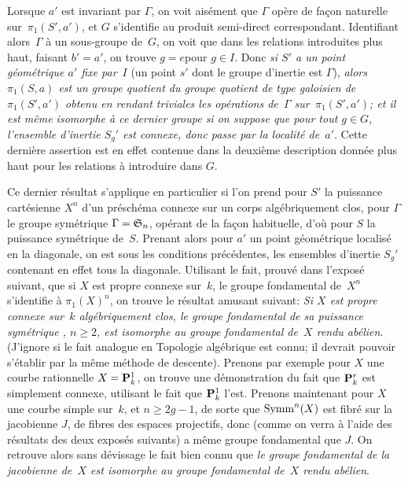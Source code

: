 \begin{remarque}
Lorsque $a'$ est invariant par $\Gamma$, on voit ais\'ement que
$\Gamma$ op\`ere de fa\c con naturelle sur~$\pi_1(S',a')$, et $G$
s'identifie au produit semi-direct correspondant. Identifiant alors~$\Gamma$
\`a
un sous-groupe de~$G$, on voit que dans les relations
introduites plus haut, faisant $b'=a'$, on trouve \og $g = e$\fg pour
$g\in I$. Donc \emph{si $S'$ a un point géométrique $a'$ fixe
par}~$I$ (\ie un point $s'$ dont le groupe d'inertie est $\Gamma$),
\emph{alors $\pi_1(S,a)$ est un groupe quotient du groupe quotient de
type galoisien de~$\pi_1(S',a')$ obtenu en \emph{\og rendant
triviales\fg} les opérations de~$\Gamma$ sur~$\pi_1(S',a')$; et il
est même isomorphe à ce dernier groupe si on suppose que pour
tout $g\in G$, l'ensemble d'inertie $S_g'$ est connexe, donc passe par
la localité de~$a'$}. Cette derni\`ere assertion est en effet
contenue dans la deuxi\`eme description donn\'ee plus haut pour
les relations \`a introduire dans $G$.

Ce dernier r\'esultat s'applique en particulier si l'on prend pour
$S'$ la puissance cart\'esienne $X^n$ d'un pr\'esch\'ema connexe
sur un corps alg\'ebriquement clos, pour $\Gamma$ le groupe
sym\'etrique $\Gamma={\mathfrak {S}}_n$, op\'erant de la fa\c con
habituelle, d'o\`u pour $S$ la puissance sym\'etrique \nieme
de~$S$. Prenant alors pour $a'$ un point g\'eom\'etrique
localis\'e en la diagonale, on est sous les conditions
pr\'ec\'edentes, les ensembles d'inertie $S_g'$ contenant en effet
tous la diagonale. Utilisant le fait, prouv\'e dans l'expos\'e
suivant, que si $X$ est propre connexe sur~$k$, le groupe fondamental
de~$X^n$ s'identifie \`a $\pi_1(X)^n$, on trouve le r\'esultat
amusant suivant: \emph{Si $X$ est propre connexe sur~$k$
algébriquement clos, le groupe fondamental de sa puissance
symétrique \nieme, $n \geq 2$, est isomorphe au groupe
fondamental de~$X$ rendu abélien}. (J'ignore si le fait analogue
en Topologie alg\'ebrique est connu; il devrait pouvoir
s'\'etablir par la m\^eme m\'ethode de descente). Prenons par
exemple pour $X$ une courbe rationnelle $X=\mathbf{P}^1_k$, on trouve une
\Nieme d\'emonstration du fait que $\mathbf{P}^r_k$ est simplement
connexe, utilisant le fait que $\mathbf{P}^1_k$ l'est. Prenons maintenant
pour $X$ une courbe simple sur~$k$, et $n\geq 2g-1$, de sorte que
$\operatorname{Symm}^n(X)$ est fibr\'e sur la jacobienne $J$, de fibres des
espaces projectifs, donc (comme on verra \`a l'aide des
r\'esultats des deux expos\'es suivants) a m\^eme groupe
fondamental que $J$. On retrouve alors sans d\'evissage le fait bien
connu que \emph{le groupe fondamental de la jacobienne de~$X$ est
isomorphe au groupe fondamental de~$X$ rendu abélien}.
\end{remarque}

